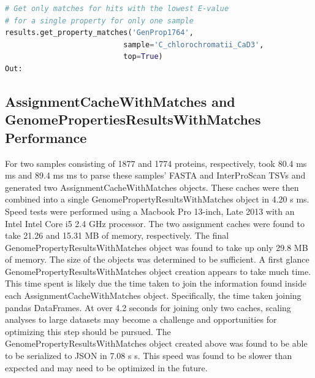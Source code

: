 \begin{lstlisting}[language=Python]  
# Get only matches for hits with the lowest E-value 
# for a single property for only one sample                                     
results.get_property_matches('GenProp1764', 
                           sample='C_chlorochromatii_CaD3',
                           top=True)
Out:
\end{lstlisting}

\begin{table}[!ht]
\centering
{}
\end{table}

\subsection{AssignmentCacheWithMatches and GenomePropertiesResultsWithMatches Performance}

For two samples consisting of 1877 and 1774 proteins, respectively, took 80.4 ms  ms and 89.4 ms  ms to parse these samples' FASTA and InterProScan TSVs and generated two AssignmentCacheWithMatches objects. These caches were then combined into a single GenomePropertyResultsWithMatches object in 4.20 s  ms. Speed tests were performed using a Macbook Pro 13-inch, Late 2013 with an Intel Intel Core i5 2.4 GHz processor. The two assignment caches were found to take 21.26 and 15.31 MB of memory, respectively. The final GenomePropertyResultsWithMatches object was found to take up only 29.8 MB of memory. The size of the objects was determined to be sufficient. A first glance GenomePropertyResultsWithMatches object creation appears to take much time. This time spent is likely due the time taken to join the information found inside each AssignmentCacheWithMatches object. Specifically, the time taken joining pandas DataFrames. At over 4.2 seconds for joining only two caches, scaling analyses to large datasets may become a challenge and opportunities for optimizing this step should be pursued. The GenomePropertyResultsWithMatches object created above was found to be able to be serialized to JSON in 7.08 s  s. This speed was found to be slower than expected and may need to be optimized in the future.


